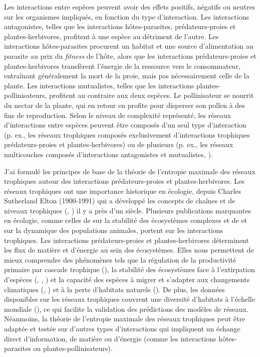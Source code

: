 Les interactions entre espèces peuvent avoir des effets positifs, négatifs ou
neutres sur les organismes impliqués, en fonction du type d'interaction. Les
interactions antagonistes, telles que les interactions hôtes-parasites,
prédateurs-proies et plantes-herbivores, profitent à une espèce au détriment de
l'autre. Les interactions hôtes-parasites procurent un habitat et une source
d'alimentation au parasite au prix du \textit{fitness} de l'hôte, alors que les
interactions prédateurs-proies et plantes-herbivores transfèrent l'énergie de la
ressource vers le consommateur, entraînant généralement la mort de la proie,
mais pas nécessairement celle de la plante. Les interactions mutualistes, telles
que les interactions plantes-pollinisateurs, profitent au contraire aux deux
espèces. Le pollinisateur se nourrit du nectar de la plante, qui en retour en
profite pour disperser son pollen à des fins de reproduction. Selon le niveau de
complexité représenté, les réseaux d'interactions entre espèces peuvent être
composés d'un seul type d'interaction (p. ex., les réseaux trophiques composés
exclusivement d'interactions trophiques prédateurs-proies et plantes-herbivores)
ou de plusieurs (p. ex., les réseaux multicouches composés d'interactions
antagonistes et mutualistes, \cite{Pilosof2017Multilayer}).

J'ai formulé les principes de base de la théorie de l'entropie maximale des
réseaux trophiques autour des interactions prédateurs-proies et
plantes-herbivores. Les réseaux trophiques ont une importance historique en
écologie, depuis Charles Sutherland Elton (1900-1991) qui a développé les
concepts de chaînes et de niveaux trophiques (\cite{Elton1927Animal},
\cite{Elton1958Ecology}) il y a près d'un siècle. Plusieurs publications
marquantes en écologie, comme celles de \cite{May1972Will} sur la stabilité des
écosystèmes complexes et de \cite{Lotka1925Elements} et
\cite{Volterra1927Fluctuations} sur la dynamique des populations animales,
portent sur les interactions trophiques. Les interactions prédateurs-proies et
plantes-herbivores déterminent les flux de matière et d'énergie au sein des
écosystèmes. Elles nous permettent de mieux comprendre des phénomènes tels que
la régulation de la productivité primaire par cascade trophique
(\cite{Carpenter1987Regulation}), la stabilité des écosystèmes face à
l'extirpation d'espèces (\cite{Dunne2002Network}, \cite{Srinivasan2007Response},
\cite{Staniczenko2010Structural}) et la capacité des espèces à migrer et
s'adapter aux changements climatiques (\cite{Tylianakis2008Global},
\cite{Gilman2010Framework}) et à la perte d'habitats naturels
(\cite{Evans2013Robustness}). De plus, les données disponibles sur les réseaux
trophiques couvrent une diversité d'habitats à l'échelle mondiale
(\cite{Poisot2021Global}), ce qui facilite la validation des prédictions des
modèles de réseaux. Néanmoins, la théorie de l'entropie maximale des réseaux
trophiques peut être adaptée et testée sur d'autres types d'interactions qui
impliquent un échange direct d'information, de matière ou d'énergie (comme les
interactions hôtes-parasites ou plantes-pollinisateurs).


